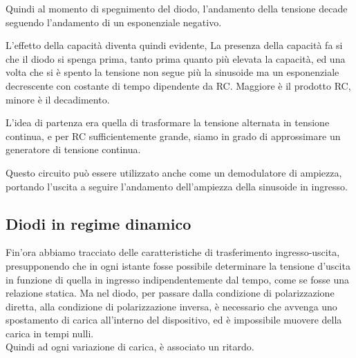 \documentclass[../elettronica]{subfiles}
\begin{document}
\noindent Quindi al momento di spegnimento del diodo, l'andamento della tensione decade seguendo l'andamento di
un esponenziale negativo.

\begin{figure}[h]
    \centering
    \def\tf{5*180/8}

\end{figure}

\noindent L'effetto della capacità diventa quindi evidente,
La presenza della capacità fa si che il diodo si spenga prima, tanto prima quanto più elevata la capacità, ed una volta
che si è spento la tensione non segue più la sinusoide ma un esponenziale decrescente con costante di
tempo dipendente da RC. Maggiore è il prodotto RC, minore è il decadimento.

L'idea di partenza era quella di trasformare la tensione alternata in tensione continua, e per RC sufficientemente grande,
siamo in grado di approssimare un generatore di tensione continua.

Questo circuito può essere utilizzato anche come un demodulatore di ampiezza, portando l'uscita a seguire l'andamento
dell'ampiezza della sinusoide in ingresso.

\newpage
\subsection{Diodi in regime dinamico}
\label{sec:regime_dinamico}
Fin'ora abbiamo tracciato delle caratteristiche di trasferimento ingresso-uscita, presupponendo che in ogni istante
fosse possibile determinare la tensione d'uscita in funzione di quella in ingresso indipendentemente dal tempo, come
se fosse una relazione statica.
Ma nel diodo, per passare dalla condizione di polarizzazione diretta, alla condizione di polarizzazione inversa, è necessario
che avvenga uno spostamento di carica all'interno del dispositivo, ed è impossibile muovere della carica in tempi nulli.
\\
Quindi ad ogni variazione di carica, è associato un ritardo.
\end{document}
